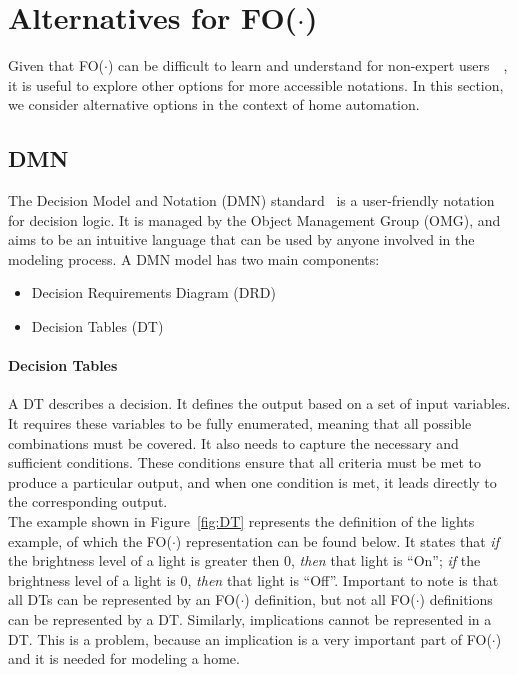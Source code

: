 \documentclass[11pt,a4paper]{report}
\newcommand{\fodot}{FO($\cdot$)\xspace}
\begin{document}
\section{Alternatives for \fodot}
Given that \fodot can be difficult to learn and understand for non-expert users~\cite{Deryck}~\cite{DMN}, it is useful to explore other options for more accessible notations. In this section, we consider alternative options in the context of home automation.

\subsection{DMN}
The Decision Model and Notation (DMN) standard~\cite{DMN} is a user-friendly notation for decision logic. It is managed by the Object Management Group (OMG), and aims to be an intuitive language that can be used by anyone involved in the modeling process. A DMN model has two main components:
\begin{itemize}
	\item Decision Requirements Diagram (DRD)
    \item Decision Tables (DT)
\end{itemize}

\paragraph{Decision Tables}
A DT describes a decision. It defines the output based on a set of input variables. It requires these variables to be fully enumerated, meaning that all possible combinations must be covered. It also needs to capture the necessary and sufficient conditions. These conditions ensure that all criteria must be met to produce a particular output, and when one condition is met, it leads directly to the corresponding output.\\
The example shown in Figure~\ref{fig:DT} represents the definition of the lights example, of which the \fodot representation can be found below. It states that \textit{if} the brightness level of a light is greater then 0, \textit{then} that light is ``On''; \textit{if} the brightness level of a light is 0, \textit{then} that light is ``Off''. Important to note is that all DTs can be represented by an \fodot definition, but not all \fodot definitions can be represented by a DT. Similarly, implications cannot be represented in a DT. This is a problem, because an implication is a very important part of \fodot and it is needed for modeling a home.
\end{document}
